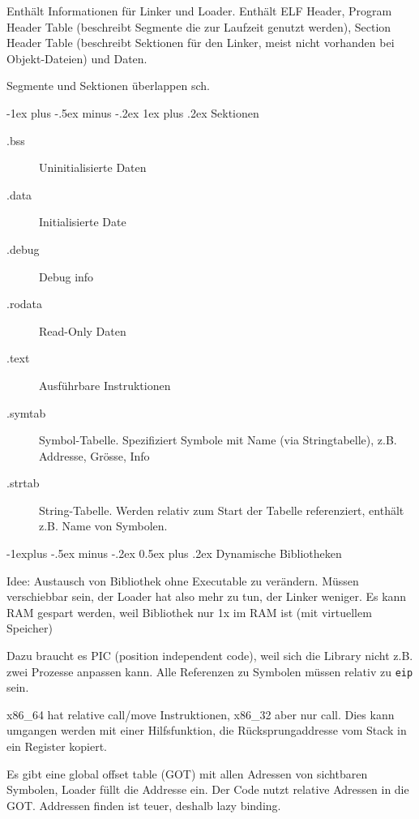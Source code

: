 \documentclass[10pt,landscape,a4paper]{article}
\makeatletter
\renewcommand{\subsection}{\@startsection{subsection}{2}{0mm}%
                                {-1explus -.5ex minus -.2ex}%
                                {0.5ex plus .2ex}%
                                {\normalfont\small\bfseries}}
\renewcommand{\subsubsection}{\@startsection{subsubsection}{3}{0mm}%
                                {-1ex plus -.5ex minus -.2ex}%
                                {1ex plus .2ex}%
                                {\normalfont\footnotesize\bfseries}}
\makeatother
\begin{document}
\begin{multicols*}{3}
Enthält Informationen für Linker und Loader. Enthält ELF Header,
Program Header Table (beschreibt Segmente die zur Laufzeit genutzt werden),
Section Header Table (beschreibt Sektionen für den Linker, meist nicht vorhanden
bei Objekt-Dateien) und Daten.

Segmente und Sektionen überlappen sch.

\subsubsection{Sektionen}

\begin{description}
  \item[.bss] Uninitialisierte Daten
  \item[.data] Initialisierte Date
  \item[.debug] Debug info
  \item[.rodata] Read-Only Daten
  \item[.text] Ausführbare Instruktionen
  \item[.symtab] Symbol-Tabelle. Spezifiziert Symbole mit Name (via
    Stringtabelle), z.B. Addresse, Grösse, Info
  \item[.strtab] String-Tabelle. Werden relativ zum Start der Tabelle
    referenziert, enthält z.B. Name von Symbolen.
\end{description}

\subsection{Dynamische Bibliotheken}

Idee: Austausch von Bibliothek ohne Executable zu verändern. Müssen verschiebbar
sein, der Loader hat also mehr zu tun, der Linker weniger. Es kann RAM gespart
werden, weil Bibliothek nur 1x im RAM ist (mit virtuellem Speicher)

Dazu braucht es PIC (position independent code), weil sich die Library nicht
z.B. zwei Prozesse anpassen kann. Alle Referenzen zu Symbolen müssen relativ zu
\verb|eip| sein.

x86\_64 hat relative call/move Instruktionen, x86\_32 aber nur call. Dies kann
umgangen werden mit einer Hilfsfunktion, die Rücksprungaddresse vom Stack in ein
Register kopiert.

Es gibt eine global offset table (GOT) mit allen Adressen von sichtbaren
Symbolen, Loader füllt die Addresse ein. Der Code nutzt relative Adressen in
die GOT. Addressen finden ist teuer, deshalb lazy binding.


\end{multicols*}
\end{document}
